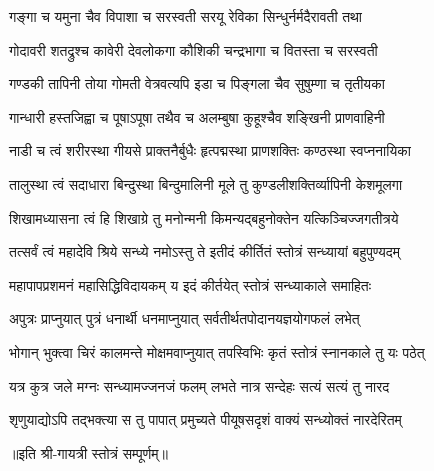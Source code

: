 \twolineshloka
{गङ्गा च यमुना चैव विपाशा च सरस्वती}
{सरयू रेविका सिन्धुर्नर्मदैरावती तथा}

\twolineshloka
{गोदावरी शतद्रुश्च कावेरी देवलोकगा}
{कौशिकी चन्द्रभागा च वितस्ता च सरस्वती}

\twolineshloka
{गण्डकी तापिनी तोया गोमती वेत्रवत्यपि}
{इडा च पिङ्गला चैव सुषुम्णा च तृतीयका}

\twolineshloka
{गान्धारी हस्तजिह्वा च पूषाऽपूषा तथैव च}
{अलम्बुषा कुहूश्चैव शङ्खिनी प्राणवाहिनी}

\twolineshloka
{नाडी च त्वं शरीरस्था गीयसे प्राक्तनैर्बुधैः}
{हृत्पद्मस्था प्राणशक्तिः कण्ठस्था स्वप्ननायिका}

\twolineshloka
{तालुस्था त्वं सदाधारा बिन्दुस्था बिन्दुमालिनी}
{मूले तु कुण्डलीशक्तिर्व्यापिनी केशमूलगा}

\twolineshloka
{शिखामध्यासना त्वं हि शिखाग्रे तु मनोन्मनी}
{किमन्यद्बहुनोक्तेन यत्किञ्चिज्जगतीत्रये}

\twolineshloka
{तत्सर्वं त्वं महादेवि श्रिये सन्ध्ये नमोऽस्तु ते}
{इतीदं कीर्तितं स्तोत्रं सन्ध्यायां बहुपुण्यदम्}

\twolineshloka
{महापापप्रशमनं महासिद्धिविदायकम्}
{य इदं कीर्तयेत् स्तोत्रं सन्ध्याकाले समाहितः}

\twolineshloka
{अपुत्रः प्राप्नुयात् पुत्रं धनार्थी धनमाप्नुयात्}
{सर्वतीर्थतपोदानयज्ञयोगफलं लभेत्}

\twolineshloka
{भोगान् भुक्त्वा चिरं कालमन्ते मोक्षमवाप्नुयात्}
{तपस्विभिः कृतं स्तोत्रं स्नानकाले तु यः पठेत्}

\twolineshloka
{यत्र कुत्र जले मग्नः सन्ध्यामज्जनजं फलम्}
{लभते नात्र सन्देहः सत्यं सत्यं तु नारद}

\twolineshloka
{शृणुयाद्योऽपि तद्भक्त्या स तु पापात् प्रमुच्यते}
{पीयूषसदृशं वाक्यं सन्ध्योक्तं नारदेरितम्}

॥इति श्री-गायत्री स्तोत्रं सम्पूर्णम्॥